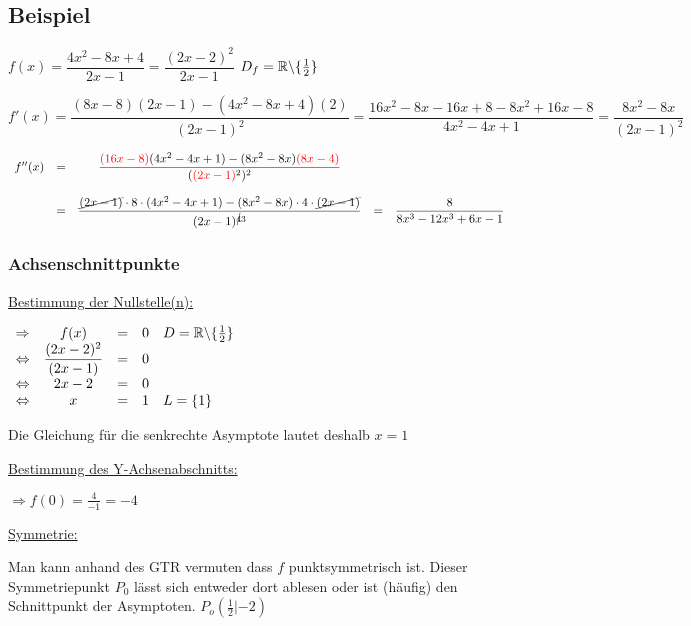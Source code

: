 \documentclass[main.tex]{subfiles}
\begin{document}
\subsection{Beispiel}

$f(x) = \dfrac{4x^2 -8x +4}{2x-1} = \dfrac{(2x-2)^2}{2x-1}$ \qquad \qquad $D_{f}=\mathbb{R} \backslash \{ \frac{1}{2} \}$

$f'(x) = \dfrac{(8x-8)(2x-1)-(4x^2-8x+4)(2)}{(2x-1)^2} = \dfrac{16x^2-8x-16x+8-8x^2+16x-8}{4x^2-4x+1} = \dfrac{8x^2-8x}{(2x-1)^2}$

$\begin{array}{rcccl}
	f''(x)  & = & \dfrac{\textcolor{red}{(16x-8)}(4x^2-4x+1)-(8x^2-8x)\textcolor{red}{(8x-4)}}{(\textcolor{red}{(2x-1)}^2)^2}\\ \\
	& = & \dfrac{\cancel{(2x-1)}\cdot 8 \cdot (4x^2-4x+1) - (8x^2-8x)\cdot 4 \cdot \cancel{(2x-1)}}{(2x-1)^{\cancel{4} 3}} & = & \dfrac{8}{8x^3-12x^3+6x-1} \\
\end{array}$


\subsubsection{Achsenschnittpunkte}

\underline{Bestimmung der Nullstelle(n):}

$\begin{array}{rcccl}
	\Rightarrow    &    f(x)    &    =    &    0 & D=\mathbb{R} \backslash \{ \frac{1}{2} \} \\
	\Leftrightarrow    &    \dfrac{(2x-2)^2}{(2x-1)}     &     =     &      0\\
	\Leftrightarrow    &    2x-2     &     =     &     0\\
	\Leftrightarrow    &    x      &    =     &     1   &  L = \{ 1 \}     \\
\end{array}$

Die Gleichung für die senkrechte Asymptote lautet deshalb $x=1$

\underline{Bestimmung des Y-Achsenabschnitts:}

$\Rightarrow f(0) = \frac{4}{-1} = -4$

\underline{Symmetrie:}

Man kann anhand des GTR vermuten dass $f$ punktsymmetrisch ist. Dieser Symmetriepunkt $P_{0}$ lässt sich entweder dort ablesen oder ist (häufig) den Schnittpunkt der Asymptoten. $P_{o}(\frac{1}{2}|-2)$\\
\end{document}
